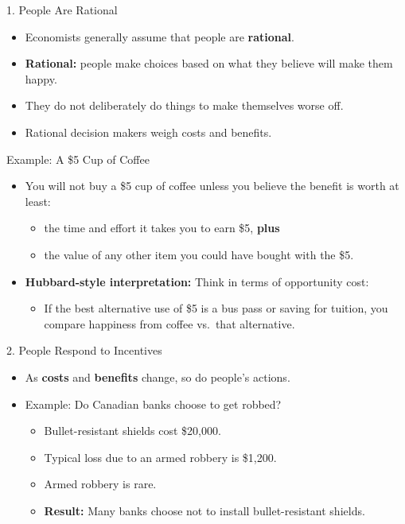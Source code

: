 \documentclass[aspectratio=169]{beamer}
\begin{document}
\begin{frame}{1. People Are Rational}
\transfade
\begin{itemize}
  \item Economists generally assume that people are \textbf{rational}.
  \item \textbf{Rational:} people make choices based on what they believe will make them happy.
  \item They do not deliberately do things to make themselves worse off.
  \item Rational decision makers weigh \alert{costs} and \alert{benefits}.
\end{itemize}
\end{frame}

\begin{frame}{Example: A \$5 Cup of Coffee}
\transfade
\begin{itemize}
  \item You will not buy a \$5 cup of coffee unless you believe the benefit is worth at least:
  \begin{itemize}
    \item the time and effort it takes you to earn \$5, \textbf{plus}
    \item the value of any other item you could have bought with the \$5.
  \end{itemize}
  \item \textbf{Hubbard-style interpretation:} Think in terms of \alert{opportunity cost}:
  \begin{itemize}
    \item If the best alternative use of \$5 is a bus pass or saving for tuition, you compare happiness from coffee vs.\ that alternative.
  \end{itemize}
\end{itemize}
\end{frame}

\begin{frame}{2. People Respond to Incentives}
\transfade
\begin{itemize}
  \item As \textbf{costs} and \textbf{benefits} change, so do people's actions.
  \item Example: Do Canadian banks choose to get robbed?
  \begin{itemize}
    \item Bullet-resistant shields cost \$20{,}000.
    \item Typical loss due to an armed robbery is \$1{,}200.
    \item Armed robbery is rare.
    \item \textbf{Result:} Many banks choose not to install bullet-resistant shields.
  \end{itemize}
\end{itemize}
\end{frame}
\end{document}
